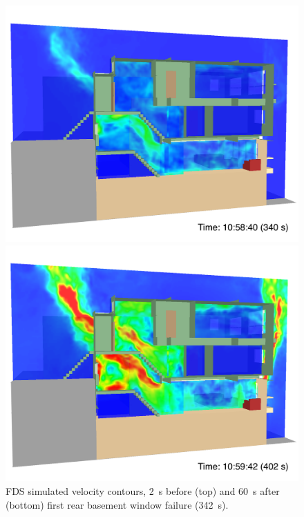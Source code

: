 \documentclass[12pt,oneside]{book}
\begin{document}
\begin{figure}[!ht]
\includegraphics[width=4.5in]{../Figures/SMV_Vel_340_s}


\includegraphics[width=4.5in]{../Figures/SMV_Vel_402_s}


\caption{FDS simulated velocity contours, 2~s before (top) and 60~s after (bottom) first rear basement window failure (342~s).}
\label{fig:smv_velocity}
\end{figure}


\clearpage
\end{document}
